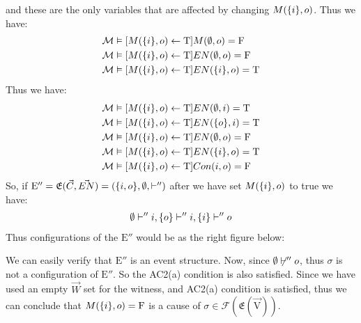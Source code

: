 \begin{example}
    and these are the only variables that are affected by changing
    $M(\{i\},o)$.
    Thus we have:
    \begin{align*}
        \mathcal{M} & \vDash [M(\{i\},o)\leftarrow \mathrm{T}] M(\emptyset,o) = \mathrm{F}     \\
        \mathcal{M} & \vDash [M(\{i\},o)\leftarrow \mathrm{T}] EN(\emptyset,o) = \mathrm{F}    \\
        \mathcal{M} & \vDash [M(\{i\},o)\leftarrow \mathrm{T}] EN(\{i\},o) = \mathrm{T}
    \end{align*}
    Thus we have:
    \begin{align*}
        \mathcal{M} & \vDash [M(\{i\},o)\leftarrow \mathrm{T}]EN(\emptyset,i) = \mathrm{T}    \\
        \mathcal{M} & \vDash [M(\{i\},o)\leftarrow \mathrm{T}]EN(\{o\},i) = \mathrm{T} \\
        \mathcal{M} & \vDash [M(\{i\},o)\leftarrow \mathrm{T}]EN(\emptyset,o) = \mathrm{F}    \\
        \mathcal{M} & \vDash [M(\{i\},o)\leftarrow \mathrm{T}]EN(\{i\},o) = \mathrm{T} \\
        \mathcal{M} & \vDash [M(\{i\},o)\leftarrow \mathrm{T}]Con(i,o) = \mathrm{F}
    \end{align*}
    So, if $\mathrm{E}'' = \mathfrak{E}(\vec C,\vec {EN}) = (\{i,o\},\emptyset, \vdash'')$
    after we have set $M(\{i\},o)$ to true we have:
    \begin{align*}
        \emptyset \vdash'' i, \{o\} \vdash'' i, \{i\} \vdash '' o
    \end{align*}
    Thus configurations of the $\mathrm{E''}$ would be as the right figure
    below:
    \begin{center}
    \end{center}
    We can easily verify that $\mathrm{E}''$ is an event structure.
    Now, since $\emptyset \not \vdash'' o$, thus $\sigma$ is not a configuration
    of $\mathrm{E}''$.
    So the AC2(a) condition is also satisfied.
    Since we have used an empty $\vec W$ set for the witness, and AC2(a)
    condition is satisfied, thus we can conclude that $M(\{i\},o) = \mathrm{F}$ is a
    cause of $\sigma \in \mathcal{F}(\mathrm{\mathfrak{E}( \vec V)})$.
\end{example}

